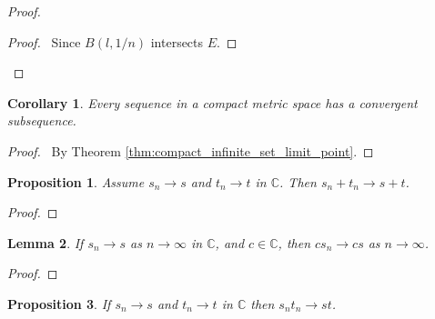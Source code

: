\documentclass{book}
\let\qed\relax
\newtheorem{prop}{Proposition}[chapter]
\newtheorem{cor}{Corollary}[prop]
\newtheorem{lm}[prop]{Lemma}
\theoremstyle{definition}
\begin{document}
\begin{proof}
\pf
{}
\begin{proof}
	\pf\ Since $B(l,1/n)$ intersects $E$.
\end{proof}
\qed
\end{proof}

\begin{cor}
\label{cor:convergent_subsequence}
Every sequence in a compact metric space has a convergent subsequence.
\end{cor}

\begin{proof}
\pf\ By Theorem \ref{thm:compact_infinite_set_limit_point}. \qed
\end{proof}

\begin{prop}
Assume $s_n \rightarrow s$ and $t_n \rightarrow t$ in $\mathbb{C}$. Then $s_n + t_n \rightarrow s + t$.
\end{prop}

\begin{proof}
\pf
{}
\qed
\end{proof}

\begin{lm}
If $s_n \rightarrow s$ as $n \rightarrow \infty$ in $\mathbb{C}$, and $c \in \mathbb{C}$, then $c s_n \rightarrow cs$ as $n \rightarrow \infty$.
\end{lm}

\begin{proof}
\pf
{}
\qed
\end{proof}

\begin{prop}
If $s_n \rightarrow s$ and $t_n \rightarrow t$ in $\mathbb{C}$ then $s_n t_n \rightarrow st$.
\end{prop}
\end{document}

